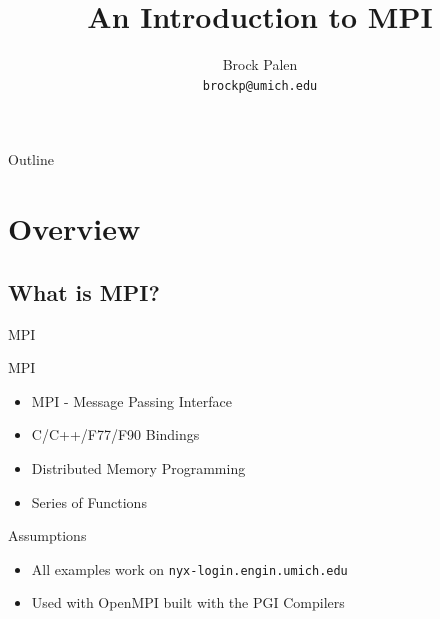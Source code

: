 \documentclass{beamer}
\title[CAC Intro] {An Introduction to MPI}
\author{Brock Palen\\ \texttt{brockp@umich.edu}}
\begin{document}
  \begin{frame}
    \titlepage
  \end{frame}

  \begin{frame}{Outline}
    \tableofcontents
  \end{frame}
  
\section{Overview}
 \subsection {What is MPI?}

\begin{frame}{MPI}
 \begin{block}{MPI}
   \begin{itemize}
     \item MPI - Message Passing Interface
     \item C/C++/F77/F90 Bindings
     \item Distributed Memory Programming
     \item Series of Functions
   \end{itemize}
 \end{block}
   \begin{block}{Assumptions}
     \begin{itemize}
       \item All examples work on \texttt{nyx-login.engin.umich.edu}
       \item Used with OpenMPI built with the PGI Compilers
     \end{itemize}
   \end{block}
\end{frame}
\end{document}
